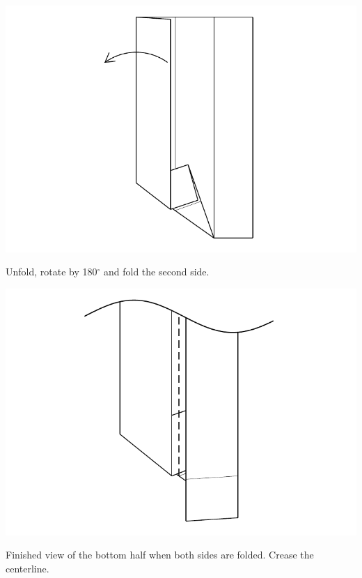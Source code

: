 \documentclass[11pt]{article}
\begin{document}
\begin{minipage}[t]{0.45\textwidth}
  \includegraphics[width=\textwidth]{../figs/fig05-06}
  \begin{itemize}{\item[6.] Unfold, rotate by 180$^\circ$ and fold the second side.}\end{itemize}
\end{minipage}
\hfill
\begin{minipage}[t]{0.45\textwidth}
  \includegraphics[width=\textwidth]{../figs/fig05-07}
  \begin{itemize}{\item[7.] Finished view of the bottom half when both sides are folded.  Crease the centerline.}\end{itemize}
\end{minipage}
\end{document}

